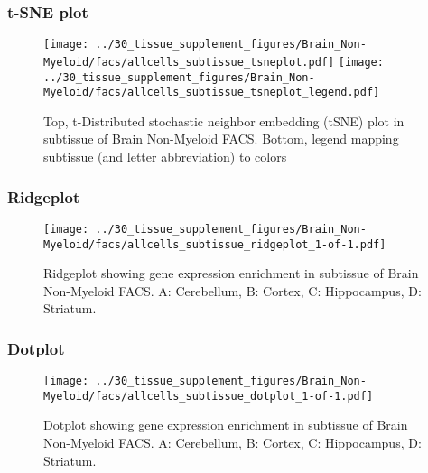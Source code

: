 \newpage
\subsubsection{t-SNE plot}
\begin{figure}[h]
\centering
\texttt{[image: ../30\_tissue\_supplement\_figures/Brain\_Non-Myeloid/facs/allcells\_subtissue\_tsneplot.pdf]}
\texttt{[image: ../30\_tissue\_supplement\_figures/Brain\_Non-Myeloid/facs/allcells\_subtissue\_tsneplot\_legend.pdf]}
\caption{Top, t-Distributed stochastic neighbor embedding (tSNE) plot  in subtissue of Brain Non-Myeloid FACS. Bottom, legend mapping subtissue (and letter abbreviation) to colors}
\end{figure}


\newpage
\newpage
\subsubsection{Ridgeplot}
\begin{figure}[h]
\centering
\texttt{[image: ../30\_tissue\_supplement\_figures/Brain\_Non-Myeloid/facs/allcells\_subtissue\_ridgeplot\_1-of-1.pdf]}

\caption{ Ridgeplot  showing gene expression enrichment in subtissue of Brain Non-Myeloid FACS. A: Cerebellum, B: Cortex, C: Hippocampus, D: Striatum.}
\end{figure}


\newpage
\newpage
\subsubsection{Dotplot}
\begin{figure}[h]
\centering
\texttt{[image: ../30\_tissue\_supplement\_figures/Brain\_Non-Myeloid/facs/allcells\_subtissue\_dotplot\_1-of-1.pdf]}

\caption{ Dotplot  showing gene expression enrichment in subtissue of Brain Non-Myeloid FACS. A: Cerebellum, B: Cortex, C: Hippocampus, D: Striatum.}
\end{figure}


